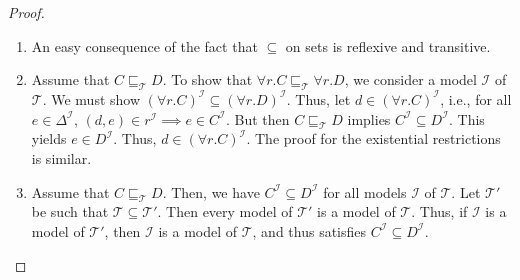 \begin{proof}
	\begin{enumerate}
		\item An easy consequence of the fact that $\subseteq$ on sets is reflexive and transitive.
		\item Assume that $C \sqsubseteq_{\mathcal{T}} D$.
			To show that $\forall r.C \sqsubseteq_{\mathcal{T}} \forall r.D$, we consider a model $\mathcal{I}$ of $\mathcal{T}$.
			We must show $ \left( \forall r.C \right)^{\mathcal{I}} \subseteq \left( \forall r.D \right)^{\mathcal{I}}$.
			Thus, let $d \in \left( \forall r.C \right)^{\mathcal{I}}$, i.e., for all $e \in \Delta^{\mathcal{I}}$,
			$\left( d,e \right) \in r^{\mathcal{I}} \implies e \in C^{\mathcal{I}}$.
			But then $C \sqsubseteq_{\mathcal{T}} D$ implies $C^{\mathcal{I}} \subseteq D^{\mathcal{I}}$.
			This yields $e \in D^{\mathcal{I}}$.
			Thus, $d \in \left( \forall r.C \right)^{\mathcal{I}}$.
			The proof for the existential restrictions is similar.
		\item Assume that $C \sqsubseteq_{\mathcal{T}} D$.
			Then, we have $C^{\mathcal{I}} \subseteq D^{\mathcal{I}}$ for all models $\mathcal{I}$ of $\mathcal{T}$.
			Let $\mathcal{T}'$ be such that $\mathcal{T} \subseteq \mathcal{T}'$.
			Then every model of $\mathcal{T}'$ is a model of $\mathcal{T}$.
			Thus, if $\mathcal{I}$ is a model of $\mathcal{T}'$, then $\mathcal{I}$ is a model of $\mathcal{T}$,
			and thus satisfies $C^{\mathcal{I}} \subseteq D^{\mathcal{I}}$.
			\qedhere
	\end{enumerate}
\end{proof}

